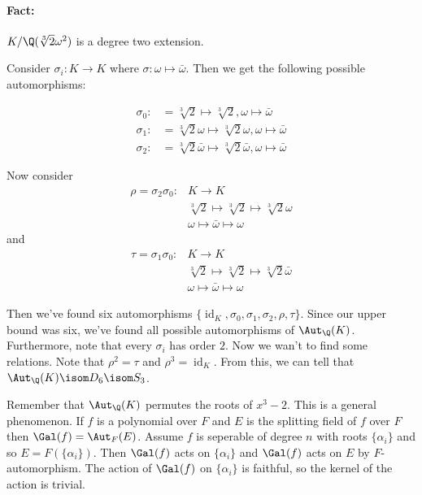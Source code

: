 \paragraph*{Fact:} $K/\Q(\sqrt[3]{2}\omega^2)$ is a degree two extension.

Consider $\sigma_i\colon K \to K$ where $\sigma\colon \omega \mapsto \bar{\omega}$. Then we get the following possible automorphisms:

\begin{align*}
	\sigma_0\colon &= \sqrt[3]{2} \mapsto \sqrt[3]{2}, \omega \mapsto \bar{\omega} \\
	\sigma_1\colon &= \sqrt[3]{2}\omega \mapsto \sqrt[3]{2}\omega, \omega \mapsto \bar{\omega} \\
	\sigma_2\colon &= \sqrt[3]{2}\bar{\omega} \mapsto \sqrt[3]{2}\bar{\omega}, \omega \mapsto \bar{\omega}
\end{align*}

Now consider 
\begin{align*}
	\rho = \sigma_2\sigma_0\colon &K \longrightarrow K \\
	                              & \sqrt[3]{2} \mapsto \sqrt[3]{2} \mapsto \sqrt[3]{2}\omega \\
	                              & \omega \mapsto \bar{\omega} \mapsto \omega
\end{align*}
and
\begin{align*}
	\tau = \sigma_1\sigma_0\colon &K \longrightarrow K \\
	                              & \sqrt[3]{2} \mapsto \sqrt[3]{2} \mapsto \sqrt[3]{2}\bar{\omega} \\
	                              & \omega \mapsto \bar{\omega} \mapsto \omega
\end{align*}

Then we've found six automorphisms $\{\operatorname{id}_K, \sigma_0, \sigma_1, \sigma_2, \rho, \tau\}$. Since our upper bound was six, we've found all possible automorphisms of $\Aut_\Q(K)$. Furthermore, note that every $\sigma_i$ has order $2$. Now we wan't to find some relations. Note that $\rho^2 = \tau$ and $\rho^3 = \operatorname{id}_K$. From this, we can tell that $\Aut_\Q(K) \isom D_6 \isom S_3$.

Remember that $\Aut_\Q(K)$ permutes the roots of $x^3 - 2$. This is a general phenomenon. If $f$ is a polynomial over $F$ and $E$ is the splitting field of $f$ over $F$ then $\Gal(f) = \Aut_F(E)$. Assume $f$ is seperable of degree $n$ with roots $\{\alpha_i\}$ and so $E = F(\{\alpha_i\})$. Then $\Gal(f)$ acts on $\{\alpha_i\}$ and $\Gal(f)$ acts on $E$ by $F$-automorphism. The action of $\Gal(f)$ on $\{\alpha_i\}$ is faithful, so the kernel of the action is trivial.

